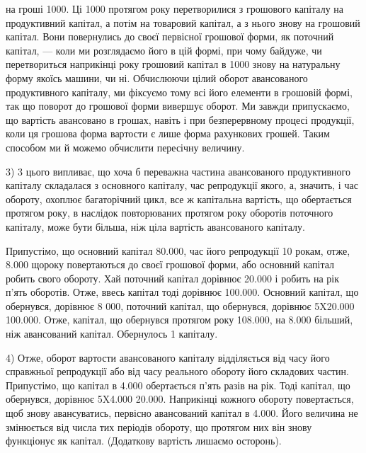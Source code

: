 \parcont{}  %
на гроші  \deq{} 1000. Ці 1000 протягом року
перетворилися з грошового капіталу на продуктивний капітал, а потім на
товаровий капітал, а з нього знову на грошовий капітал. Вони повернулись
до своєї первісної грошової форми, як поточний капітал, — коли ми
розглядаємо його в цій формі, при чому байдуже, чи перетвориться наприкінці
року грошовий капітал в 1000 знову на натуральну
форму якоїсь машини, чи ні. Обчислюючи цілий оборот авансованого продуктивного
капіталу, ми фіксуємо тому всі його елементи в грошовій формі,
так що поворот до грошової форми вивершує оборот. Ми завжди припускаємо,
що вартість авансовано в грошах, навіть і при безперервному
процесі продукції, коли ця грошова форма вартости є лише форма
рахункових грошей. Таким способом ми й можемо обчислити пересічну
величину.

3) 3 цього випливає, що хоча б переважна частина авансованого
продуктивного капіталу складалася з основного капіталу, час репродукції
якого, а, значить, і час обороту, охоплює багаторічний цикл, все ж капітальна
вартість, що обертається протягом року, в наслідок повторюваних
протягом року оборотів поточного капіталу, може бути більша, ніж ціла
вартість авансованого капіталу.

Припустімо, що основний капітал \deq{} \num{80.000}, час його репродукції
\deq{} 10 рокам, отже, \num{8.000} щороку повертаються до своєї
грошової форми, або основний капітал робить  свого обороту. Хай
поточний капітал дорівнює \num{20.000} і робить на рік п’ять оборотів.
Отже, ввесь капітал тоді дорівнює \num{100.000}. Основний
капітал, що обернувся, дорівнює 8 000, поточний капітал, що
обернувся, дорівнює 5X\num{20.000} \deq{} \num{100.000}. Отже, капітал, що
обернувся протягом року \deq{} \num{108.000}, на \num{8.000} більший,
ніж авансований капітал. Обернулось 1 \dplus{}  капіталу.

4) Отже, оборот вартости авансованого капіталу відділяється
від часу його справжньої репродукції або від часу реального обороту
його складових частин. Припустімо, що капітал в \num{4.000} обертається
п’ять разів на рік. Тоді капітал, що обернувся, дорівнює
5X\num{4.000} \deq{} \num{20.000}. Наприкінці кожного обороту повертається,
щоб знову авансуватись, первісно авансований капітал в \num{4.000}.
Його величина не змінюється від числа тих періодів обороту, що
протягом них він знову функціонує як капітал. (Додаткову вартість
лишаємо осторонь).


